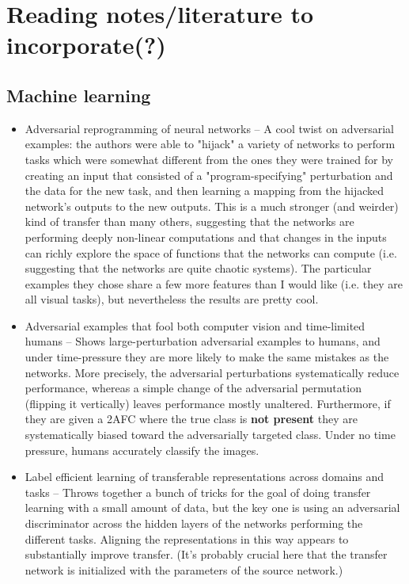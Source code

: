 \documentclass[11pt]{article}
\begin{document}
    

\section{Reading notes/literature to incorporate(?)}
\subsection{Machine learning}
\begin{itemize}
\item Adversarial reprogramming of neural networks -- A cool twist on adversarial examples: the authors were able to "hijack" a variety of networks to perform tasks which were somewhat different from the ones they were trained for by creating an input that consisted of a "program-specifying" perturbation and the data for the new task, and then learning a mapping from the hijacked network's outputs to the new outputs. This is a much stronger (and weirder) kind of transfer than many others, suggesting that the networks are performing deeply non-linear computations and that changes in the inputs can richly explore the space of functions that the networks can compute (i.e. suggesting that the networks are quite chaotic systems). The particular examples they chose share a few more features than I would like (i.e. they are all visual tasks), but nevertheless the results are pretty cool. \citep{Elsayed2018}
\item Adversarial examples that fool both computer vision and time-limited humans -- Shows large-perturbation adversarial examples to humans, and under time-pressure they are more likely to make the same mistakes as the networks. More precisely, the adversarial perturbations systematically reduce performance, whereas a simple change of the adversarial permutation (flipping it vertically) leaves performance mostly unaltered. Furthermore, if they are given a 2AFC where the true class is \textbf{not present} they are systematically biased toward the adversarially targeted class. Under no time pressure, humans accurately classify the images.
\item Label efficient learning of transferable representations across domains and tasks -- Throws together a bunch of tricks for the goal of doing transfer learning with a small amount of data, but the key one is using an adversarial discriminator across the hidden layers of the networks performing the different tasks. Aligning the representations in this way appears to substantially improve transfer. (It's probably crucial here that the transfer network is initialized with the parameters of the source network.) \citep{Luo2017} 

\end{itemize}
\end{document}
